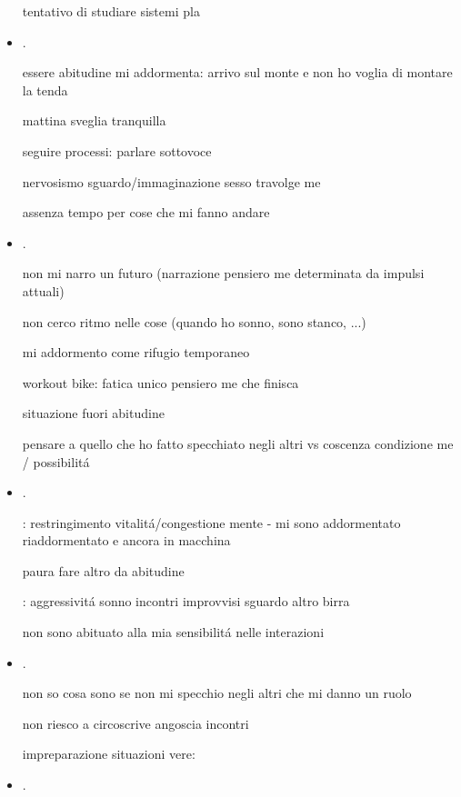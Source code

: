 \begin{itemize}
tentativo di studiare sistemi pla

\item {}.

essere abitudine mi addormenta: arrivo sul monte e non ho voglia di montare la tenda

mattina sveglia tranquilla

seguire processi: parlare sottovoce


nervosismo sguardo/immaginazione sesso travolge me

assenza tempo per cose che mi fanno andare


\item {}.

non mi narro un futuro (narrazione pensiero me determinata da impulsi attuali)

non cerco ritmo nelle cose (quando ho sonno, sono stanco, ...)

mi addormento come rifugio temporaneo

workout bike: fatica unico pensiero me che finisca

situazione fuori abitudine

pensare a quello che ho fatto specchiato negli altri vs coscenza condizione me / possibilit\'a

\item {}.

: restringimento vitalit\'a/congestione mente - mi sono addormentato riaddormentato e ancora in macchina

paura fare altro da abitudine

: aggressivit\'a sonno incontri improvvisi sguardo altro birra 

non sono abituato alla mia sensibilit\'a nelle interazioni

\item {}.

non so cosa sono se non mi specchio negli altri che mi danno un ruolo

non riesco a circoscrive angoscia incontri

impreparazione situazioni vere: 

\item {}.


\end{itemize}
